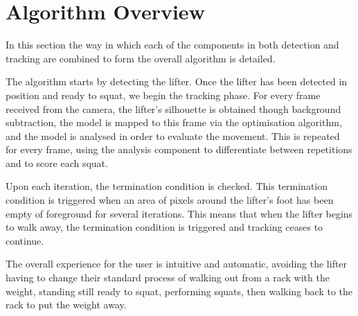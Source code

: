 \section{Algorithm Overview}
\label{sec:algorithm_overview}

In this section the way in which each of the components in both detection and tracking are combined to form the overall algorithm is detailed.

The algorithm starts by detecting the lifter. Once the lifter has been detected in position and ready to squat, we begin the tracking phase. For every frame received from the camera, the lifter's silhouette is obtained though background subtraction, the model is mapped to this frame via the optimisation algorithm, and the model is analysed in order to evaluate the movement. This is repeated for every frame, using the analysis component to differentiate between repetitions and to score each squat.

Upon each iteration, the termination condition is checked. This termination condition is triggered when an area of pixels around the lifter's foot has been empty of foreground for several iterations. This means that when the lifter begins to walk away, the termination condition is triggered and tracking ceases to continue.

The overall experience for the user is intuitive and automatic, avoiding the lifter having to change their standard process of walking out from a rack with the weight, standing still ready to squat, performing squats, then walking back to the rack to put the weight away.
